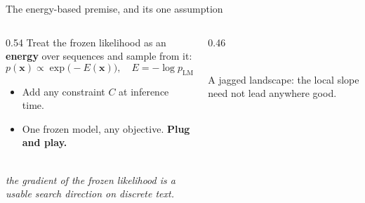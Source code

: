 \documentclass{beamer}
\begin{document}
\begin{frame}{The energy-based premise, and its one assumption}
  \begin{columns}[T]
    \begin{column}{0.54\textwidth}
      Treat the frozen likelihood as an \textbf{energy} over sequences and sample from it:
      \[ p(\bm{x}) \propto \exp\!\big(-E(\bm{x})\big),\quad E = -\log p_{\text{LM}} + \lambda\,C. \]
      \begin{itemize}
        \item Add any constraint $C$ at inference time.
        \item One frozen model, any objective. \textbf{Plug and play.}
      \end{itemize}
      \vspace{0.4em}
      \\
      \emph{the gradient of the frozen likelihood is a usable search direction on discrete text.}
    \end{column}
    \begin{column}{0.46\textwidth}
      \begin{center}
      \\[-0.3em]{\scriptsize A jagged landscape: the local slope need not lead anywhere good.}
      \end{center}
    \end{column}
  \end{columns}
\end{frame}
\end{document}
